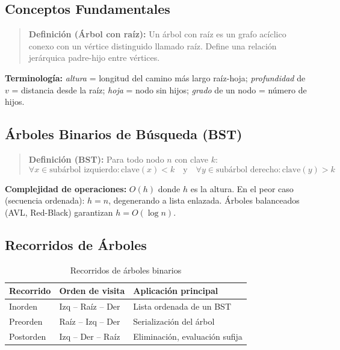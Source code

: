 \documentclass[12pt, letterpaper]{article}
\begin{document}
	\subsection{Conceptos Fundamentales}
	
	\begin{quote}
		\textbf{Definición (Árbol con raíz):}
		Un árbol con raíz es un grafo acíclico conexo con un vértice distinguido llamado raíz. Define una relación jerárquica padre-hijo entre vértices.
	\end{quote}
	
	\textbf{Terminología:} \textit{altura} = longitud del camino más largo raíz-hoja; \textit{profundidad} de $v$ = distancia desde la raíz; \textit{hoja} = nodo sin hijos; \textit{grado} de un nodo = número de hijos.
	
	\subsection{Árboles Binarios de Búsqueda (BST)}
	
	\begin{quote}
		\textbf{Definición (BST):}
		Para todo nodo $n$ con clave $k$:
		\[
		\forall x \in \text{subárbol izquierdo}: \text{clave}(x) < k
		\quad \text{y} \quad
		\forall y \in \text{subárbol derecho}: \text{clave}(y) > k
		\]
	\end{quote}
	
	\textbf{Complejidad de operaciones:} $O(h)$ donde $h$ es la altura. En el peor caso (secuencia ordenada): $h = n$, degenerando a lista enlazada. Árboles balanceados (AVL, Red-Black) garantizan $h = O(\log n)$.
	
	\subsection{Recorridos de Árboles}
	
	\begin{table}[h!]
		\centering
		\begin{tabular}{lll}
			\toprule
			\textbf{Recorrido} & \textbf{Orden de visita} & \textbf{Aplicación principal} \\
			\midrule
			Inorden    & Izq -- Raíz -- Der & Lista ordenada de un BST \\
			Preorden   & Raíz -- Izq -- Der & Serialización del árbol \\
			Postorden  & Izq -- Der -- Raíz & Eliminación, evaluación sufija \\
			\bottomrule
		\end{tabular}
		\caption{Recorridos de árboles binarios}
	\end{table}
	
\end{document}
